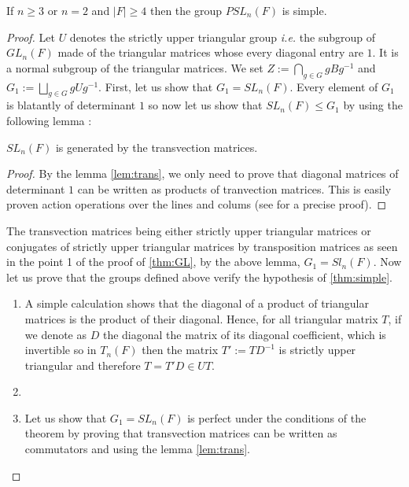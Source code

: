 \begin{theoreme}
    If $n \ge 3$ or $n = 2$ and $|F| \ge 4$ then the group $PSL_n\left( F \right)$ is simple.
\end{theoreme}

\begin{proof}
    Let $U$ denotes the strictly upper triangular group \textit{i.e.} the subgroup of $GL_n(F)$ made of the triangular matrices whose every diagonal entry are $1$. It is a normal subgroup of the triangular matrices. 
    We set $Z := \bigcap_{g \in G} g B g^{-1}$ and $G_1 := \bigsqcup_{g \in G} g U g^{-1}$. 
    First, let us show that $G_1 = SL_n\left( F \right)$. Every element of $G_1$ is blatantly of determinant $1$ so now let us show that $SL_n\left( F \right) \le G_1$ by using the following lemma :
    \begin{lemme}
        $SL_n\left( F \right)$ is generated by the transvection matrices.
    \end{lemme}

    \begin{proof}
        By the lemma \ref{lem:trans}, we only need to prove that diagonal matrices of determinant $1$ can be written as products of tranvection matrices. This is easily proven action operations over the lines and colums (see  for a precise proof).
    \end{proof}
    The transvection matrices being either strictly upper triangular matrices or conjugates of strictly upper triangular matrices by transposition matrices as seen in the point 1 of the proof of \ref{thm:GL}, by the above lemma, $G_1 = Sl_n(F)$.
    Now let us prove that the groups defined above verify the hypothesis of \ref{thm:simple}.

    \begin{enumerate}
        \item A simple calculation shows that the diagonal of a product of triangular matrices is the product of their diagonal. Hence, for all triangular matrix $T$, if we denote as $D$ the diagonal the matrix of its diagonal coefficient, which is invertible so in $T_n\left( F \right)$ then the matrix $T' := TD^{-1}$ is strictly upper triangular and therefore $T = T' D \in UT$.
        \item {} 
        \item Let us show that $G_1 = SL_n\left( F \right)$ is perfect under the conditions of the theorem by proving that transvection matrices can be written as commutators and using the lemma \ref{lem:trans}.


\end{enumerate}
\end{proof}
